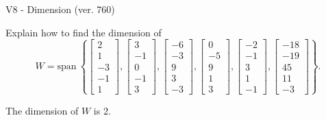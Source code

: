 \begin{exercise}
  \begin{exerciseTitle}V8 - Dimension (ver. 760)\end{exerciseTitle}
  \begin{exerciseStatement}
    Explain how to find the dimension of 
\[W=\mathrm{span}\ \left\{\left[\begin{array}{r}
2 \\
1 \\
-3 \\
-1 \\
1
\end{array}\right] , \left[\begin{array}{r}
3 \\
-1 \\
0 \\
-1 \\
3
\end{array}\right] , \left[\begin{array}{r}
-6 \\
-3 \\
9 \\
3 \\
-3
\end{array}\right] , \left[\begin{array}{r}
0 \\
-5 \\
9 \\
1 \\
3
\end{array}\right] , \left[\begin{array}{r}
-2 \\
-1 \\
3 \\
1 \\
-1
\end{array}\right] , \left[\begin{array}{r}
-18 \\
-19 \\
45 \\
11 \\
-3
\end{array}\right]\right\}.\]



  \end{exerciseStatement}
  \begin{exerciseAnswer}
   The dimension of \(W\) is  \(2\).
  


  \end{exerciseAnswer}
\end{exercise}